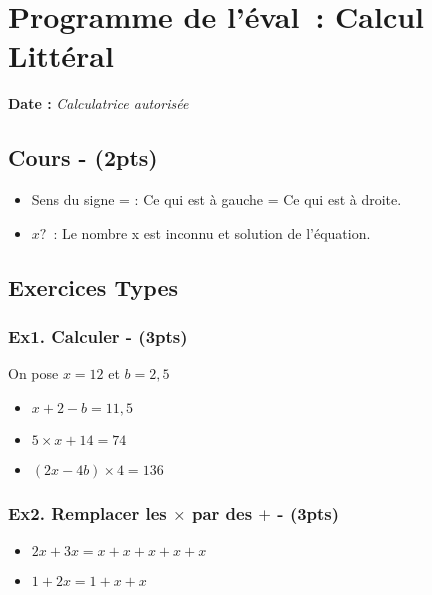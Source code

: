 



\section*{Programme de l’éval : Calcul Littéral}

\textbf{Date : } \hspace{4cm} \textit{Calculatrice autorisée}

\subsection*{Cours - (2pts)}


\begin{itemize}[label={$\bullet$}]
  \item Sens du signe = : Ce qui est à gauche = Ce qui est à droite. 
  \item $x ?$ : Le nombre x est inconnu et solution de l’équation. 
\end{itemize}


\subsection*{Exercices Types}


\subsubsection*{Ex1. Calculer  - (3pts)}

On pose $x = 12$ et $b = 2,5$
\begin{itemize}[label={$\bullet$}]
  \item  $x + 2 - b = 11,5$
  \item  $5 \times x + 14 = 74$
  \item  $(2x - 4b) \times 4 = 136$
\end{itemize}

\subsubsection*{Ex2. Remplacer les $\times$ par des $+$ - (3pts)}

\begin{itemize}[label={$\bullet$}]
  \item  $2x + 3x = x+x + x+x+x$
  \item  $1 + 2x = 1 + x + x$        
\end{itemize}

